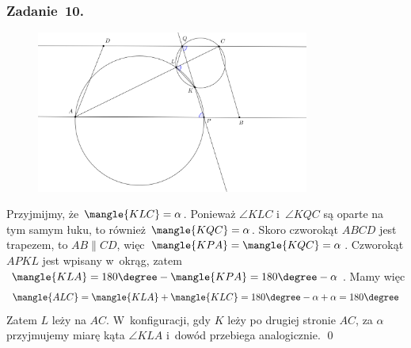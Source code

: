 \subsubsection*{Zadanie~10.}
\begin{figure}[H]
    \centering
    \includegraphics[width=0.8\textwidth]{img/2020_12_16/10.png}
\end{figure}
Przyjmijmy, że \(\mangle{KLC} = \alpha\). Ponieważ \(\angle{KLC}\) i~\(\angle{KQC}\) są oparte na tym samym łuku, to również \(\mangle{KQC} = \alpha\). Skoro czworokąt \(ABCD\) jest trapezem, to \(AB \parallel CD\), więc \(\mangle{KPA} = \mangle{KQC} = \alpha\). Czworokąt \(APKL\) jest wpisany w~okrąg, zatem \(\mangle{KLA} = 180\degree - \mangle{KPA} = 180\degree - \alpha\). Mamy więc
\begin{equation*}
    \mangle{ALC}
        = \mangle{KLA} + \mangle{KLC}
        = 180\degree - \alpha + \alpha
        = 180\degree
\end{equation*}
Zatem \(L\) leży na \(AC\). W~konfiguracji, gdy \(K\) leży po drugiej stronie \(AC\), za \(\alpha\) przyjmujemy miarę kąta \(\angle{KLA}\) i~dowód przebiega analogicznie.
\qed

